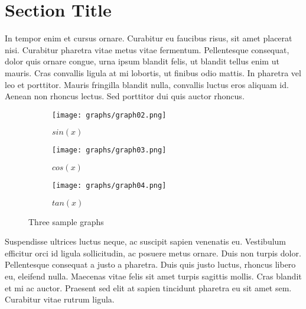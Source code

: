 \section{Section Title}
In tempor enim et cursus ornare. Curabitur eu faucibus risus, sit amet placerat nisi. Curabitur pharetra vitae metus vitae fermentum. Pellentesque consequat, dolor quis ornare congue, urna ipsum blandit felis, ut blandit tellus enim ut mauris. Cras convallis ligula at mi lobortis, ut finibus odio mattis. In pharetra vel leo et porttitor. Mauris fringilla blandit nulla, convallis luctus eros aliquam id. Aenean non rhoncus lectus. Sed porttitor dui quis auctor rhoncus. 
\begin{figure}
    \centering
    \begin{subfigure}[b]{0.3\textwidth}
        \centering
        \texttt{[image: graphs/graph02.png]}
        \caption{$sin(x)$}
        \label{fig:sin(x)}
    \end{subfigure}
    \hfill %
    \begin{subfigure}[b]{0.3\textwidth}
        \centering
        \texttt{[image: graphs/graph03.png]}
        \caption{$cos(x)$}
        \label{fig:cos(x)}
    \end{subfigure}
    \hfill %
    \begin{subfigure}[b]{0.3\textwidth}
        \centering
        \texttt{[image: graphs/graph04.png]}
        \caption{$tan(x)$}
        \label{fig:tan(x)}
    \end{subfigure}
    \caption{Three sample graphs}
    \label{fig: three graphs}
\end{figure}
Suspendisse ultrices luctus neque, ac suscipit sapien venenatis eu. Vestibulum efficitur orci id ligula sollicitudin, ac posuere metus ornare. Duis non turpis dolor. Pellentesque consequat a justo a pharetra. Duis quis justo luctus, rhoncus libero eu, eleifend nulla. Maecenas vitae felis sit amet turpis sagittis mollis. Cras blandit et mi ac auctor. Praesent sed elit at sapien tincidunt pharetra eu sit amet sem. Curabitur vitae rutrum ligula.